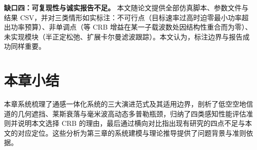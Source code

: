 \textbf{缺口四：可复现性与诚实报告不足。} 本文随论文提供全部仿真脚本、参数文件与结果 CSV，并对三类情形如实标注：不可行点（目标速率过高时迫零最小功率超出功率预算）、非单调点（等 CRB 增益在某一子载波数处因结构性重合而为零）、未实现模块（半正定松弛、扩展卡尔曼滤波跟踪）。本文认为，标注边界与报告成功同样重要。

\section{本章小结}
本章系统梳理了通感一体化系统的三大演进范式及其适用边界，剖析了低空空地信道的几何遮挡、莱斯衰落与毫米波高动态多普勒瓶颈，归纳了四类感知性能评估准则并说明本文选择 CRB 的理由，最后通过横向对比指出现有研究的四点不足与本文的对应定位。这些分析为第三章的系统建模与理论推导提供了问题背景与准则依据。
